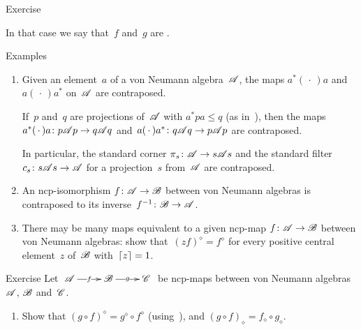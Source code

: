 \documentclass[a]{subfiles}
\begin{document}
\begin{parsec}
\begin{point}{Exercise}
\begin{point}
In that case we say that~$f$ and~$g$ are .%
\end{point}
\end{point}
\begin{point}{Examples}%
\begin{enumerate}
\item
Given an element~$a$ of a von Neumann algebra~$\mathscr{A}$,
the maps $a^*(\,\cdot\,)a$ and~$a(\,\cdot\,)a^*$
on~$\mathscr{A}$ are contraposed.

If~$p$ and~$q$ are projections of~$\mathscr{A}$
with $a^*pa\leq q$
(as in~),
then the maps
$a^*(\,\cdot\,)a \colon p\mathscr{A} p\to q\mathscr{A} q$
and~$a(\,\cdot\,)a^*\colon q\mathscr{A} q \to p\mathscr{A} p$
are contraposed.

In particular,
the standard corner $\pi_s\colon \mathscr{A}\to s \mathscr{A} s$
and the standard filter $c_s\colon s\mathscr{A} s\to \mathscr{A}$
for a projection~$s$ from~$\mathscr{A}$
are contraposed.
\item
An ncp-isomorphism $f\colon \mathscr{A}\to\mathscr{B}$
between von Neumann algebras
is contraposed to its inverse~$f^{-1}\colon \mathscr{B}\to\mathscr{A}$.
\item
There may be many maps equivalent to a given ncp-map $f\colon \mathscr{A}\to\mathscr{B}$
between von Neumann algebras:
show that~$(zf)^\diamond = f^\diamond$
for every positive central element~$z$ of~$\mathscr{B}$ with~$\left\lceil z\right\rceil=1$.
\end{enumerate}
\end{point}
\begin{point}{Exercise}%
Let $\xymatrix{
	\scrA\ar[r]|-{f}&
	\scrB\ar[r]|-{g}&
\scrC}$
be ncp-maps between von Neumann algebras~$\mathscr{A}$,
$\mathscr{B}$ and~$\mathscr{C}$.
\begin{enumerate}
\item
Show that $(g\circ f)^\diamond = g^\diamond\circ f^\diamond$
(using~),
and $(g\circ f)_\diamond = f_\diamond\circ g_\diamond$.


\end{enumerate}
\end{point}
\end{parsec}
\end{document}
